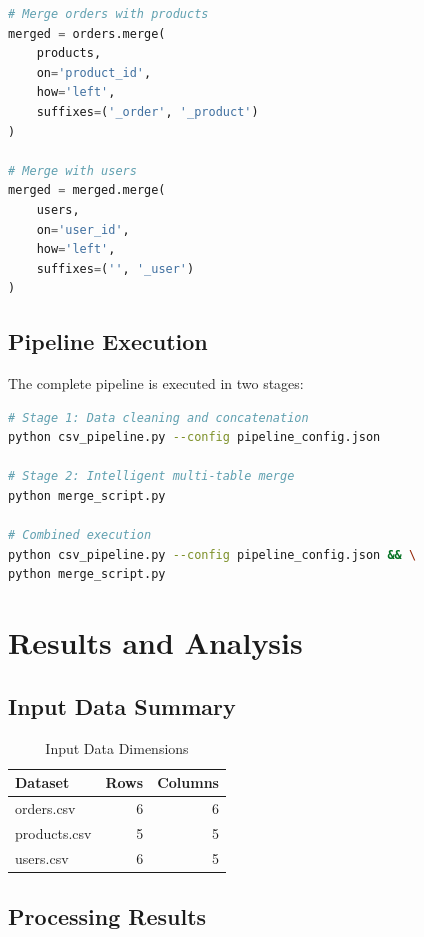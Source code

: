\documentclass[12pt,a4paper]{report}
\begin{document}
\begin{lstlisting}[language=Python]
# Merge orders with products
merged = orders.merge(
    products, 
    on='product_id', 
    how='left', 
    suffixes=('_order', '_product')
)

# Merge with users
merged = merged.merge(
    users, 
    on='user_id', 
    how='left', 
    suffixes=('', '_user')
)
\end{lstlisting}

\section{Pipeline Execution}

The complete pipeline is executed in two stages:

\begin{lstlisting}[language=bash]
# Stage 1: Data cleaning and concatenation
python csv_pipeline.py --config pipeline_config.json

# Stage 2: Intelligent multi-table merge
python merge_script.py

# Combined execution
python csv_pipeline.py --config pipeline_config.json && \
python merge_script.py
\end{lstlisting}

\chapter{Results and Analysis}

\section{Input Data Summary}

\begin{table}[h]
\centering
\begin{tabular}{|l|r|r|}
\hline
\textbf{Dataset} & \textbf{Rows} & \textbf{Columns} \\
\hline
orders.csv & 6 & 6 \\
products.csv & 5 & 5 \\
users.csv & 6 & 5 \\
\hline
\end{tabular}
\caption{Input Data Dimensions}
\end{table}

\section{Processing Results}
\end{document}
